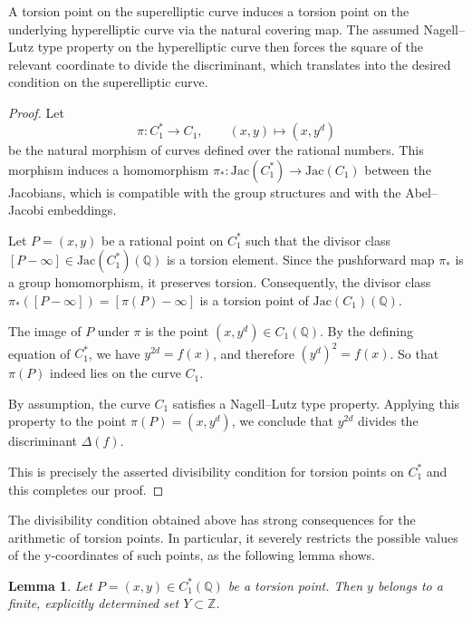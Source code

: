 \documentclass[12pt, reqno]{amsart}
\newtheorem{lemma}[thm]{Lemma}
\numberwithin{equation}{section}
\theoremstyle{definition}
\theoremstyle{nodefstyle}
\begin{document}
A torsion point on the superelliptic curve induces a torsion point on the underlying hyperelliptic curve via the natural covering map. The assumed Nagell--Lutz type property on the hyperelliptic curve then forces the square of the relevant coordinate to divide the discriminant, which translates into the desired condition on the superelliptic curve.
\begin{proof}
Let
\[
\pi : C_1^* \longrightarrow C_1,\qquad (x,y)\longmapsto (x,y^d)
\]
be the natural morphism of curves defined over the rational numbers. This morphism induces a homomorphism $\pi_* : \mathrm{Jac}(C_1^*) \longrightarrow \mathrm{Jac}(C_1)
$ between the Jacobians, which is compatible with the group structures and with the Abel--Jacobi embeddings.

Let \(P=(x,y)\) be a rational point on \(C_1^*\) such that the divisor class$[P-\infty]\in \mathrm{Jac}(C_1^*)(\mathbb{Q})$ is a torsion element. Since the pushforward map \(\pi_*\) is a group homomorphism, it preserves torsion. Consequently, the divisor class $\pi_*([P-\infty])=[\pi(P)-\infty]$ is a torsion point of \(\mathrm{Jac}(C_1)(\mathbb{Q})\).

The image of \(P\) under \(\pi\) is the point
$(x,y^d)\in C_1(\mathbb{Q}).$ By the defining equation of \(C_1^*\), we have \(y^{2d}=f(x)\), and therefore $(y^d)^2=f(x)$. So that \(\pi(P)\) indeed lies on the curve \(C_1\).

By assumption, the curve \(C_1\) satisfies a Nagell--Lutz type property. Applying this property to the point \(\pi(P)=(x,y^d)\), we conclude that \(y^{2d}\) divides the discriminant \(\Delta(f)\).

This is precisely the asserted divisibility condition for torsion points on \(C_1^*\) and this completes our proof.
\end{proof}

The divisibility condition obtained above has strong consequences for the arithmetic of torsion points. In particular, it severely restricts the possible values of the 
y-coordinates of such points, as the following lemma shows.

\begin{lemma}\label{lem:2}
Let \(P=(x,y)\in C_1^*(\mathbb Q)\) be a torsion point.
Then \(y\) belongs to a finite, explicitly determined set \(Y\subset\mathbb Z\).
\end{lemma}
\end{document}
